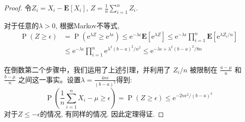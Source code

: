 \begin{proof}
    令$Z_i=X_i-\mathbf{E}\left[X_i\right]$, $Z=\frac 1 n \sum_{i=1}^n Z_i.$

    对于任意的$\lambda>0$, 根据Markov不等式, 
    $$
    \begin{aligned}
    \operatorname{P}(Z \geq \epsilon) & =\operatorname{P}\left(\mathrm{e}^{\lambda Z} \geq \mathrm{e}^{\lambda \epsilon}\right) \leq \mathrm{e}^{-\lambda \epsilon} \mathbf{E}\left[\mathrm{e}^{\lambda Z}\right] \leq \mathrm{e}^{-\lambda \epsilon} \prod_{i=1}^n \mathbf{E}\left[\mathrm{e}^{\lambda Z_i / n}\right] \\
    & \leq \mathrm{e}^{-\lambda \epsilon} \prod_{i=1}^n \mathrm{e}^{\lambda^2(b-a)^2 / n^2} \leq \mathrm{e}^{-\lambda \epsilon+\lambda^2(b-a)^2 / 8 n}
    \end{aligned}
    $$

    在倒数第二个步骤中，我们运用了上述引理，并利用了 $Z_i/n$ 被限制在 $\frac{a - \mu}{n}$ 和 $\frac{b - \mu}{n}$ 之间这一事实。设置$\lambda=\frac{4 n \epsilon}{(b-a)^2}$得到: 
    $$
\operatorname{P}\left(\frac{1}{n} \sum_{i=1}^n X_i-\mu \geq \epsilon\right)=\operatorname{P}(Z \geq \epsilon) \leq \mathrm{e}^{-2 n \epsilon^2 /(b-a)^2}
$$
对于$Z\leq -\epsilon$的情况, 有同样的情况. 因此定理得证. 

\end{proof}




